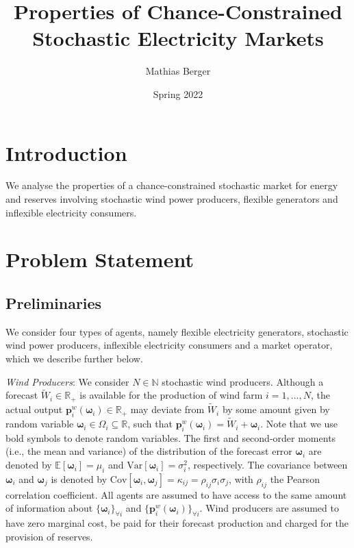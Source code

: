 \documentclass{article}
\title{Properties of Chance-Constrained Stochastic Electricity Markets}
\author{Mathias Berger}
\date{Spring 2022}
\begin{document}
\maketitle

\section{Introduction}

We analyse the properties of a chance-constrained stochastic market for energy and reserves involving stochastic wind power producers, flexible generators and inflexible electricity consumers. 

\section{Problem Statement}

\subsection{Preliminaries}

We consider four types of agents, namely flexible electricity generators, stochastic wind power producers, inflexible electricity consumers and a market operator, which we describe further below.

\textit{Wind Producers}: We consider $N \in \mathbb{N}$ stochastic wind producers. Although a forecast $\tilde{W}_i \in \mathbb{R}_+$ is available for the production of wind farm $i = 1, \ldots, N$, the actual output $\mathbf{p}_i^w(\boldsymbol{\omega}_i) \in \mathbb{R}_+$ may deviate from $\tilde{W}_i$ by some amount given by random variable $\boldsymbol{\omega}_i \in \Omega_i \subseteq \mathbb{R}$, such that $\mathbf{p}_i^w(\boldsymbol{\omega}_i) = \tilde{W}_i + \boldsymbol{\omega}_i$. Note that we use bold symbols to denote random variables. The first and second-order moments (i.e., the mean and variance) of the distribution of the forecast error $\boldsymbol{\omega}_i$ are denoted by $\mathbb{E}[\boldsymbol{\omega}_i] = \mu_i$ and $\mbox{Var}[\boldsymbol{\omega}_i] = \sigma_i^2$, respectively. The covariance between $\boldsymbol{\omega}_i$ and $\boldsymbol{\omega}_j$ is denoted by $\mbox{Cov}[\boldsymbol{\omega}_i, \boldsymbol{\omega}_j] = \kappa_{ij} = \rho_{ij} \sigma_i \sigma_j$, with $\rho_{ij}$ the Pearson correlation coefficient. All agents are assumed to have access to the same amount of information about $\{\boldsymbol{\omega}_i\}_{\forall i}$ and $\{\mathbf{p}_i^w(\boldsymbol{\omega}_i)\}_{\forall i}$. Wind producers are assumed to have zero marginal cost, be paid for their forecast production and charged for the provision of reserves.
\end{document}
